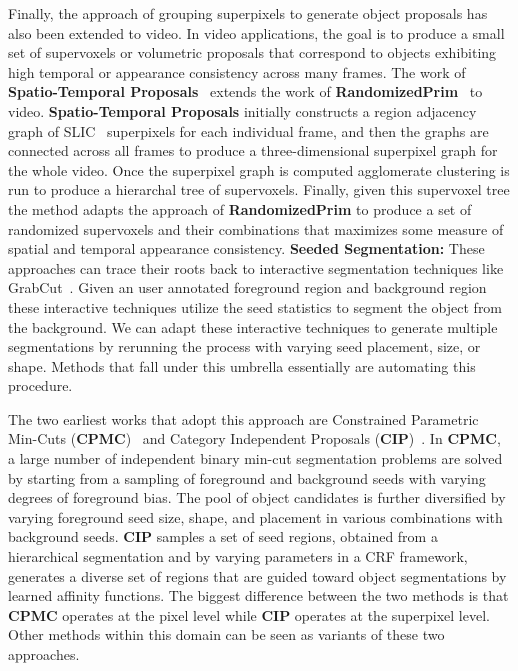 Finally, the approach of grouping superpixels to generate object proposals has also been extended to video. In video applications, the goal is to produce a small set of supervoxels or volumetric proposals that correspond to objects exhibiting high temporal or appearance consistency across many frames. The work of {\bf Spatio-Temporal Proposals}~\cite{Oneata:etal:ECCV14} extends the work of {\bf RandomizedPrim}~\cite{Manen:etal:ICCV13} to video.  {\bf Spatio-Temporal Proposals} initially constructs a region adjacency graph of SLIC~\cite{Achanta:etal:PAMI12} superpixels for each individual frame, and then the graphs are connected across all frames to produce a three-dimensional superpixel graph for the whole video. Once the superpixel graph is computed agglomerate clustering is run to produce a hierarchal tree of supervoxels. Finally, given this supervoxel tree the method adapts the approach of {\bf RandomizedPrim} to produce a set of randomized supervoxels and their combinations that maximizes some measure of spatial and temporal appearance consistency.
\newline
\newline
\noindent
{\bf Seeded Segmentation:} These approaches can trace their roots back to interactive segmentation techniques like GrabCut~\cite{Rother:etal:GRAPHICS04}. Given an user annotated foreground region and background region these interactive techniques utilize the seed statistics to segment the object from the background. We can adapt these interactive techniques to generate multiple segmentations by rerunning the process with varying seed placement, size, or shape. Methods that fall under this umbrella essentially are automating this procedure.

The two earliest works that adopt this approach are Constrained Parametric Min-Cuts ({\bf CPMC})~\cite{Carreira:Sminchisescu:PAMI12} and Category Independent Proposals ({\bf CIP})~\cite{Endres:Hoiem:PAMI14}. In {\bf CPMC}, a large number of independent binary min-cut segmentation problems are solved by starting from a sampling of foreground and background seeds with varying degrees of foreground bias. The pool of object candidates is further diversified by varying foreground seed size, shape, and placement in various combinations with background seeds. {\bf CIP} samples a set of seed regions, obtained from a hierarchical segmentation and by varying parameters in a CRF framework, generates a diverse set of regions that are guided toward object segmentations by learned affinity functions. The biggest difference between the two methods is that {\bf CPMC} operates at the pixel level while {\bf CIP} operates at the superpixel level. Other methods within this domain can be seen as variants of these two approaches. 

